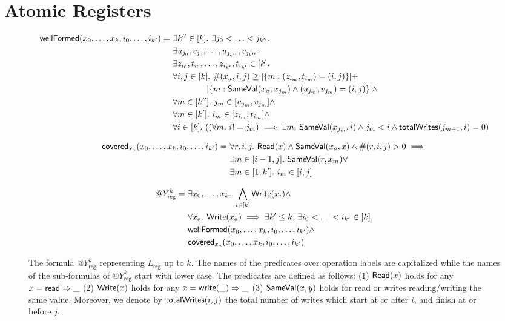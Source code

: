 
\section{Atomic Registers}
\label{sec:registers}

\begin{figure*}[h]
{\small
\begin{align*}
\pred{wellFormed}(x_0,\ldots,x_{k},{i_{0}},\ldots,{i_{k'}}) =\ 
  &\exists k'' \in [k].\ \exists {j_{0}}<\ldots<{j_{k''}}.\\
  &\exists u_{j_{0}},v_{j_{0}},\ldots,
    u_{j_{k''}},v_{j_{k''}}.\\
 &\exists z_{i_{0}},t_{i_{0}},\ldots,z_{i_{k'}},t_{i_{k'}}
   \in [k].\\
& \forall i,j \in [k].\ 
  \#({x_a},i,j) \geq 
  |\set{m : (z_{i_{m}},t_{i_{m}}) = (i,j)}| + \\
&  \qquad\qquad|\set{m : 
    \pred{SameVal}({x_a},x_{j_m}) \land
    (u_{j_{m}},v_{j_{m}}) = (i,j) }| \land\\
& \forall m \in [k''].\ {j_{m}} \in [u_{j_m},v_{j_m}]
\land\\
& \forall m \in [k'].\ 
  {i_{m}} \in [z_{i_{m}},t_{i_{m}}] \land\\
& \forall i \in [k].\ ((\forall m.\ i != j_m) \implies 
\exists m .\ \pred{SameVal}(x_{j_m},i) \land j_m < i \land 
\pred{totalWrites}(j_{m+1},i) = 0)
\end{align*}

\begin{align*}
\pred{covered}_{x_a}(x_0,\ldots,x_{k},{i_{0}},\ldots,{i_{k'}}) =\ 
  & 
    \forall r,i,j.\ \pred{Read}(x) \land \pred{SameVal}({x_a},x) \land \#(r,i,j) > 0 
    \implies\\
  & \exists m \in [i-1,j].\ \pred{SameVal}(r,x_{m}) \lor\\
  & \exists m \in [1,k'].\ {i_{m}} \in [i,j]
\end{align*}

\begin{align*}
@Y_\mathsf{reg}^k =\ 
  &\exists x_0,\ldots,x_{k}.\ 
    \bigwedge_{i \in [k]} \pred{Write}(x_i) \land\\
  &\forall {x_a}.\ \pred{Write}({x_a}) \implies
  \exists k' \leq k.\ 
  \exists {i_{0}}<\ldots<{i_{k'}} \in [k].\\ 
  &\pred{wellFormed}(x_0,\ldots,x_{k},{i_{0}},\ldots,{i_{k'}}) \land\\
  &\pred{covered}_{x_a}(x_0,\ldots,x_{k},{i_{0}},\ldots,{i_{k'}})
\end{align*}
}
\caption{The formula $@Y_\mathsf{reg}^k$ representing $L_\mathsf{reg}$ up to $k$. 
The names of the predicates over operation labels are capitalized while the 
names of the sub-formulas of $@Y_\mathsf{reg}^k$ start with lower case. The 
predicates are defined as follows: 
(1) ${\sf Read}(x)$ holds for any $x={\sf read}=>\_$  
(2) ${\sf Write}(x)$ holds for any $x={\sf write}(\_)=>\_$  
(3) ${\sf SameVal}(x,y)$ holds for read or writes reading/writing the same 
value. Moreover, we denote by ${\sf totalWrites}(i,j)$ the total number of 
writes which start at or after $i$, and finish at or before $j$.
}
\label{fig:register}
\end{figure*}


